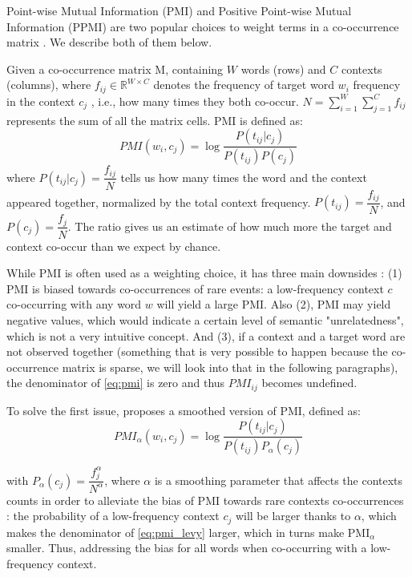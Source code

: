 Point-wise Mutual Information (PMI) \cite{Church1990} and Positive Point-wise Mutual Information (PPMI) \cite{niwa1994co} are two popular choices to weight terms in a co-occurrence matrix \cite{turney2010,JurafskyM17}. We describe both of them below.

Given a co-occurrence matrix M, containing $W$ words (rows) and $C$ contexts (columns), where $f_{ij} \in \mathbb{R}^{W\times C}$ denotes the frequency of  target word $w_i$ frequency in the context $c_j$ , i.e., how many times they both co-occur. $N=\sum_{i=1}^W\sum_{j=1}^Cf_{ij}$ represents the sum of all the matrix cells. PMI is defined as:
\begin{equation} \label{eq:pmi}
PMI(w_i,c_j) = \log\dfrac{P(t_{ij}|c_j)}{P(t_{ij})P(c_j)}
\end{equation}
where  $P(t_{ij}|c_j)=\dfrac{f_{ij}}{N}$ tells us how many times the word and the context appeared together, normalized by the total context frequency. $P(t_{ij})= \dfrac{f_{ij}}{N}$, and $P(c_j)=\dfrac{f_j}{N}$. The ratio gives us an estimate of how much more the target and context co-occur than we expect by chance.

While PMI is often used as a weighting choice, it has three main downsides \cite{JurafskyM17,levy2015improving}: (1) PMI is biased towards co-occurrences of rare events: a low-frequency context $c$ co-occurring with any word $w$ will yield a large PMI. Also (2), PMI may yield negative values, which would indicate a certain level of semantic "unrelatedness", which is not a  very intuitive concept. And (3),  if a context and a target word are not observed together (something that is very possible to happen because the co-occurrence matrix is sparse, we will look into that in the following paragraphs), the denominator of \ref{eq:pmi} is zero and thus $PMI_{ij}$ becomes undefined. 

To solve the first issue, \cite{levy2015improving} proposes a smoothed version of PMI, defined as:
\begin{equation} \label{eq:pmi_levy}
PMI_\alpha(w_i,c_j) = \log\dfrac{P(t_{ij}|c_j)}{P(t_{ij})P_\alpha(c_j)}
\end{equation}

with $P_\alpha(c_j) = \dfrac{f_j^\alpha}{N^\alpha}$, where $\alpha$ is a smoothing parameter that affects the contexts counts in order to alleviate the bias of PMI towards rare contexts co-occurrences : the probability of a low-frequency context $c_j$ will be larger thanks to $\alpha$, which makes the denominator of \ref{eq:pmi_levy} larger, which in turns make PMI$_\alpha$ smaller. Thus, addressing the bias for all words when co-occurring with a low-frequency context.


